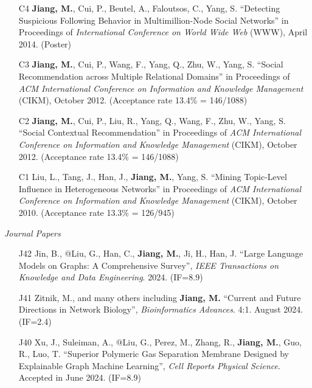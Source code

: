 \documentclass[10pt]{article}
\newenvironment{myindentpar}[1]%
{\begin{list}{}%
         {\setlength{\leftmargin}{#1}}%
         \item[]%
}
{\end{list}}
\newcounter{list}
\begin{document}
\begin{myindentpar}{0.00cm}
\begin{enumerate}[leftmargin=.5cm]
\item[C4] \textbf{Jiang, M.}, Cui, P., Beutel, A., Faloutsos, C., Yang, S. ``Detecting Suspicious Following Behavior in Multimillion-Node Social Networks'' in Proceedings of \textit{International Conference on World Wide Web} (WWW), April 2014. (Poster)

\item[C3] \textbf{Jiang, M.}, Cui, P., Wang, F., Yang, Q., Zhu, W., Yang, S. ``Social Recommendation across Multiple Relational Domains'' in Proceedings of \textit{ACM International Conference on Information and Knowledge Management} (CIKM), October 2012. (Acceptance rate 13.4\% = 146/1088)

\item[C2] \textbf{Jiang, M.}, Cui, P., Liu, R., Yang, Q., Wang, F., Zhu, W., Yang, S. ``Social Contextual Recommendation'' in Proceedings of \textit{ACM International Conference on Information and Knowledge Management} (CIKM), October 2012. (Acceptance rate 13.4\% = 146/1088)

\item[C1] Liu, L., Tang, J., Han, J., \textbf{Jiang, M.}, Yang, S. ``Mining Topic-Level Influence in Heterogeneous Networks'' in Proceedings of \textit{ACM International Conference on Information and Knowledge Management} (CIKM), October 2010. (Acceptance rate 13.3\% = 126/945)

\end{enumerate}

\hspace{-0.25cm}\textit{Journal Papers}

\begin{enumerate}[leftmargin=.5cm]

\item[J42] Jin, B., @Liu, G., Han, C., \textbf{Jiang, M.}, Ji, H., Han, J. ``Large Language Models on Graphs: A Comprehensive Survey'', \textit{IEEE Transactions on Knowledge and Data Engineering}. 2024. (IF=8.9)

\item[J41] Zitnik, M., and many others including \textbf{Jiang, M.} ``Current and Future Directions in Network Biology'', \textit{Bioinformatics Advances}. 4:1. August 2024. (IF=2.4)

\item[J40] Xu, J., Suleiman, A., @Liu, G., Perez, M., Zhang, R., \textbf{Jiang, M.}, Guo, R., Luo, T. ``Superior Polymeric Gas Separation Membrane Designed by Explainable Graph Machine Learning'', \textit{Cell Reports Physical Science}. Accepted in June 2024. (IF=8.9)
	

\end{enumerate}
\end{myindentpar}
\end{document}
